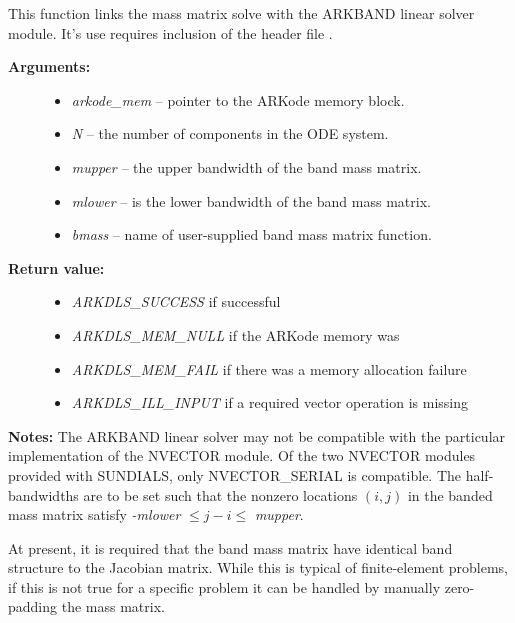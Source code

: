 \documentclass[letterpaper,10pt,english]{sphinxmanual}
\begin{document}
\begin{fulllineitems}
\label{c_interface/User_callable:ARKMassBand}
This function links the mass matrix solve with the ARKBAND linear
solver module.  It's use requires inclusion of the header file
.
\begin{description}
\item[{\textbf{Arguments:}}] \leavevmode\begin{itemize}
\item {} 
\emph{arkode\_mem} -- pointer to the ARKode memory block.

\item {} 
\emph{N} -- the number of components in the ODE system.

\item {} 
\emph{mupper} -- the upper bandwidth of the band mass matrix.

\item {} 
\emph{mlower} -- is the lower bandwidth of the band mass matrix.

\item {} 
\emph{bmass} -- name of user-supplied band mass matrix function.

\end{itemize}

\item[{\textbf{Return value:}}] \leavevmode\begin{itemize}
\item {} 
\emph{ARKDLS\_SUCCESS}   if successful

\item {} 
\emph{ARKDLS\_MEM\_NULL}  if the ARKode memory was 

\item {} 
\emph{ARKDLS\_MEM\_FAIL}  if there was a memory allocation failure

\item {} 
\emph{ARKDLS\_ILL\_INPUT} if a required vector operation is missing

\end{itemize}

\end{description}

\textbf{Notes:} The ARKBAND linear solver may not be compatible with the
particular implementation of the NVECTOR module. Of the two
NVECTOR modules provided with SUNDIALS, only
NVECTOR\_SERIAL is compatible. The half-bandwidths are to be set
such that the nonzero locations $(i, j)$ in the banded
mass matrix satisfy \emph{-mlower} $\le j-i \le$ \emph{mupper}.

At present, it is required that the band mass matrix have identical
band structure to the Jacobian matrix.  While this is typical of
finite-element problems, if this is not true for a specific problem
it can be handled by manually zero-padding the mass matrix.

\end{fulllineitems}
\end{document}
